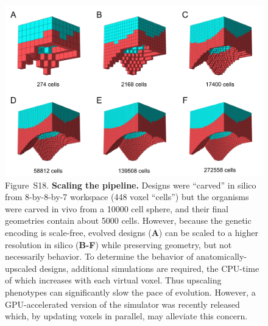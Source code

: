 \begin{figure}[t]
\centering
\includegraphics[width=\linewidth]{Chapter07/img/SupplementalScaling.png}
\caption*{Figure~S18.  \textbf{Scaling the pipeline.} Designs were ``carved'' in silico from 8-by-8-by-7 workspace (448 voxel ``cells'') but the organisms were carved in vivo from a 10000 cell sphere, and their final geometries contain about 5000 cells. 
However, because the genetic encoding is scale-free, evolved designs (\textbf{A}) can be scaled to a higher resolution in silico (\textbf{B-F}) while preserving geometry, but not necessarily behavior. 
To determine the behavior of anatomically-upscaled designs, additional simulations are required, the CPU-time of which increases with each virtual voxel. 
Thus upscaling phenotypes can significantly slow the pace of evolution. 
However, a GPU-accelerated version of the simulator was recently released which, by updating voxels in parallel, may alleviate this concern. 
}
\end{figure}

